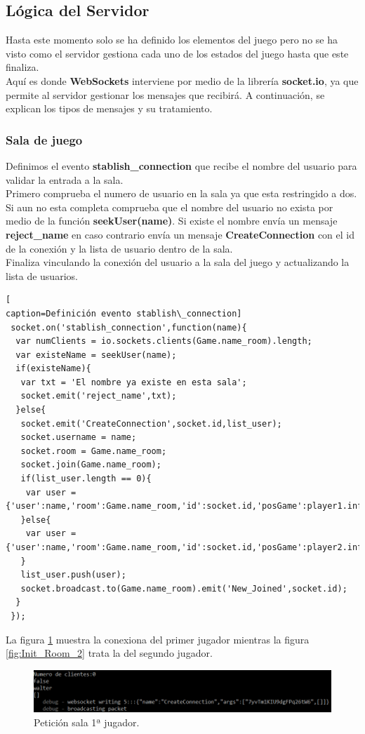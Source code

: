 \subsection{Lógica del Servidor}
Hasta este momento solo se ha definido los elementos del juego pero no se ha visto como el servidor gestiona cada uno de los estados del juego hasta que este finaliza.
\\Aquí es donde \textbf{WebSockets} interviene por medio de la librería \textbf{socket.io}, ya que permite al servidor gestionar los mensajes que recibirá. A continuación, se explican los tipos de mensajes y su tratamiento.
\subsubsection*{Sala de juego}
Definimos el evento \textbf{stablish\_connection} que recibe el nombre del usuario para validar la entrada a la sala.
\\Primero comprueba el numero de usuario en la sala ya que esta restringido a dos. Si aun no esta completa comprueba que el nombre del usuario no exista por medio de la función \textbf{seekUser(name)}. Si existe el nombre envía un mensaje \textbf{reject\_name} en caso contrario envía un mensaje \textbf{CreateConnection} con el id de la conexión y la lista de usuario dentro de la sala.
\\Finaliza vinculando la conexión del usuario a la sala del juego y actualizando la lista de usuarios.
\begin{lstlisting}[
caption=Definición evento stablish\_connection]
 socket.on('stablish_connection',function(name){
  var numClients = io.sockets.clients(Game.name_room).length;
  var existeName = seekUser(name);
  if(existeName){
   var txt = 'El nombre ya existe en esta sala';
   socket.emit('reject_name',txt);
  }else{
   socket.emit('CreateConnection',socket.id,list_user); 
   socket.username = name;
   socket.room = Game.name_room;
   socket.join(Game.name_room);
   if(list_user.length == 0){
    var user = {'user':name,'room':Game.name_room,'id':socket.id,'posGame':player1.info,'pos':1,'score':0};
   }else{
    var user = {'user':name,'room':Game.name_room,'id':socket.id,'posGame':player2.info,'pos':2,'score':0};
   }
   list_user.push(user);
   socket.broadcast.to(Game.name_room).emit('New_Joined',socket.id);
  }
 });
\end{lstlisting}
La figura \ref{fig:Init_Room_1} muestra la conexiona del primer jugador mientras la figura \ref{fig:Init_Room_2} trata la del segundo jugador.
\begin{figure}[!h]
\begin{center}
  \includegraphics[width=0.9\linewidth]{Figures/Init_Room}
	\decoRule
	\caption[ServidorSeñalizacion]{Petición sala 1ª jugador.}
\label{fig:Init_Room_1}
\end{center}
\end{figure}
